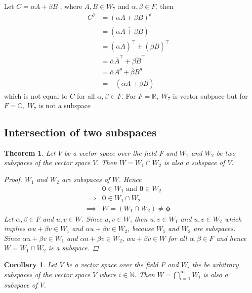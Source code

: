 \documentclass[a4paper, titlepage]{article}
\newtheorem{theorem}{Theorem}[section]
\newtheorem{corollary}{Corollary}[theorem]
\begin{document}
\begin{enumerate}[label=\textbf{\arabic*.}]
    Let 
    $C = \alpha A + \beta B$
    , where $A, B \in W_7$ and $\alpha, \beta \in F$, then 
    \begin{align*}
        C^\theta &= (\alpha A + \beta B)^\theta \\
                 &= (\overline{\alpha A + \beta B})^\top \\
                 &= (\overline{\alpha A})^\intercal + (\overline{\beta B})^\intercal \\
                 &= \overline{\alpha} \overline{A}^\intercal + \overline{\beta B}^\intercal \\
                 &= \overline{\alpha} A^\theta + \overline{\beta} B^\theta \\
                 &= - (\overline{\alpha} A + \overline{\beta} B)
    \end{align*}
    which is not equal to $C$ for all $\alpha, \beta \in F$. 
    For $F = \mathbb{R}, \; W_7$ is vector subpace but for 
    $F = \mathbb{C}, \; W_7$ is not a subspace
\end{enumerate}


\begin{center}
    \date{$10^{\text{th}}$ September 2021}
\end{center}

\subsection{Intersection of two subspaces}

\begin{theorem}
    Let $V$ be a vector space over the field F and $W_1$ and $W_2$ 
    be two subspaces of the vector space $V$. Then $W = W_1 \cap W_2$ 
    is also a subspace of $V$.
    \begin{proof}
        $W_1$ and $W_2$ are subspaces of $W$. Hence
        \begin{align*}
            & \bm{0} \in W_1 \text{ and } \bm{0} \in W_2 \\
            \implies & \bm{0} \in W_1 \cap W_2 \\
            \implies & W = (W_1 \cap W_2) \neq \bm{\phi}
        \end{align*}
        Let $\alpha, \beta \in F$ and $u, v \in W$. Since $u, v \in W$,
        then $u, v \in W_1$ and $u, v \in W_2$ which implies 
        $\alpha u + \beta v \in W_1$ and $\alpha u + \beta v \in W_2$,
        because $W_1$ and $W_2$ are subspaces. 
        Since $\alpha u + \beta v \in W_1$ and $\alpha u + \beta v \in W_2$, 
        $\alpha u + \beta v \in W$ for all $\alpha, \beta \in F$ and 
        hence $W = W_1 \cap W_2$ is a subspace.
    \end{proof}
\end{theorem}
\begin{corollary}
    Let $V$ be a vector space over the field F and $W_i$ the be 
    arbitrary subspaces of the vector space $V$ where $i \in \mathbb{N}$. 
    Then $W = \displaystyle\bigcap_{i = 1}^{\infty} W_i$ is also a 
    subspace of $V$.
\end{corollary}
\end{document}
